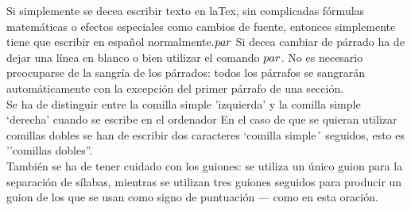 \documentclass[a4paper,10pt]{letter}
\begin{document}
Si simplemente se decea escribir texto en laTex,
sin complicadas f\'ormulas matem\'aticas o efectos especiales
como cambios de fuente, entonces simplemente tiene que escribir
en español normalmente.$\\par$
Si decea cambiar de párrado ha de dejar una línea en blanco o bien
utilizar el comando $\\par$.
No es necesario preocuparse de la sangría de los párrados:
todos los párrafos se sangrarán automáticamente con la excepción
del primer párrafo de una sección.\\
Se ha de distinguir entre la comilla simple 'izquierda'
y la comilla simple `derecha' cuando se escribe en el ordenador
En el caso de que se quieran utilizar comillas dobles se han de
escribir dos caracteres `comilla simple´ seguidos, esto es
''comillas dobles''.\\
También se ha de tener cuidado con los guiones: se utiliza un único
guion para la separación de sílabas, mientras se utilizan
tres guiones seguidos para producir un guion de los que se usan 
como signo de puntuación --- como en esta oración. 
\end{document}
